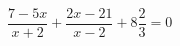 \begin{ex}[type=equation]
	\begin{condition}
		$\dfrac{7 - 5x}{x + 2} + \dfrac{2x - 21}{x - 2}+ 8\dfrac{2}{3} = 0$
	\end{condition}
\end{ex}